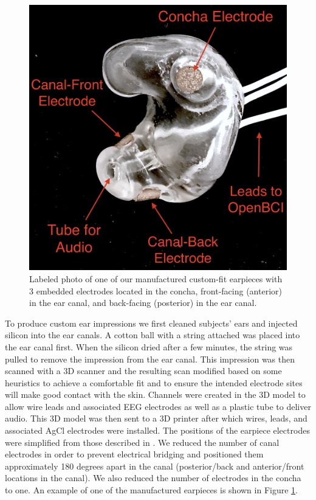 \documentclass{sigchi}
\begin{document}
\begin{figure}[htbp]
\centering
\includegraphics[width=.75\linewidth]{./figures/CFEEEG_piecefig_Right.jpg}
\caption{Labeled photo of one of our manufactured custom-fit earpieces with 3 embedded electrodes located in the concha, front-facing (anterior) in the ear canal, and back-facing (posterior) in the ear canal.}
\label{fig:earpiece_diagram}
\end{figure}

To produce custom ear impressions we first cleaned subjects' ears and injected silicon into the ear canals. A cotton ball with a string attached was placed into the ear canal first. When the silicon dried after a few minutes, the string was pulled to remove the impression from the ear canal. This impression was then scanned with a 3D scanner and the resulting scan modified based on some heuristics to achieve a comfortable fit and to ensure the intended electrode sites will make good contact with the skin. Channels were created in the 3D model to allow wire leads and associated EEG electrodes as well as a plastic tube to deliver audio. This 3D model was then sent to a 3D printer after which wires, leads, and associated AgCl electrodes were installed. The positions of the earpiece electrodes were simplified from those described in \cite{Mikkelsen2015}. We reduced the number of canal electrodes in order to prevent electrical bridging and positioned them approximately 180 degrees apart in the canal (posterior/back and anterior/front locations in the canal). We also reduced the number of electrodes in the concha to one. An example of one of the manufactured earpieces is shown in Figure \ref{fig:earpiece_diagram}.
\end{document}
